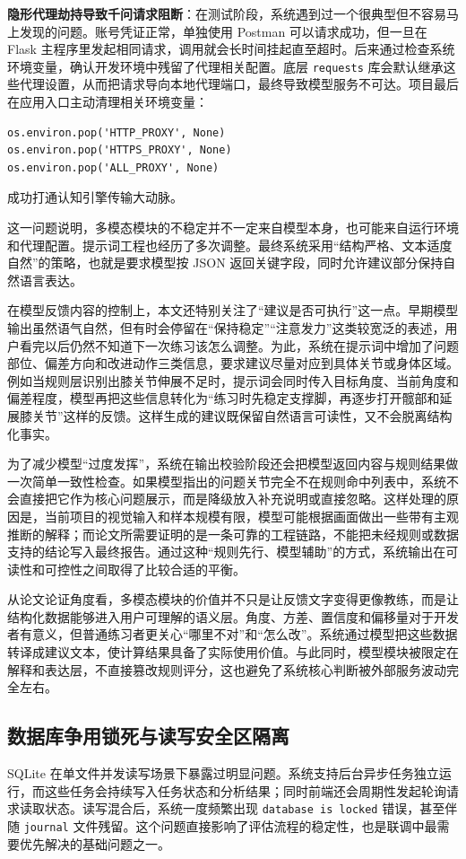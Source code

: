 \documentclass[UTF8,twoside]{ctexrep}
\makeatletter
\def@NAT@last@yr{\@citea}%
\def@NAT@last@yr{-\NAT@penalty}%
\makeatother
\begin{document}
\textbf{隐形代理劫持导致千问请求阻断}：在测试阶段，系统遇到过一个很典型但不容易马上发现的问题。账号凭证正常，单独使用 Postman 可以请求成功，但一旦在 Flask 主程序里发起相同请求，调用就会长时间挂起直至超时。后来通过检查系统环境变量，确认开发环境中残留了代理相关配置。底层 \texttt{requests} 库会默认继承这些代理设置，从而把请求导向本地代理端口，最终导致模型服务不可达。项目最后在应用入口主动清理相关环境变量：
\begin{verbatim}
os.environ.pop('HTTP_PROXY', None)
os.environ.pop('HTTPS_PROXY', None)
os.environ.pop('ALL_PROXY', None)
\end{verbatim}
成功打通认知引擎传输大动脉。

这一问题说明，多模态模块的不稳定并不一定来自模型本身，也可能来自运行环境和代理配置。提示词工程也经历了多次调整。最终系统采用“结构严格、文本适度自然”的策略，也就是要求模型按 JSON 返回关键字段，同时允许建议部分保持自然语言表达。

在模型反馈内容的控制上，本文还特别关注了“建议是否可执行”这一点。早期模型输出虽然语气自然，但有时会停留在“保持稳定”“注意发力”这类较宽泛的表述，用户看完以后仍然不知道下一次练习该怎么调整。为此，系统在提示词中增加了问题部位、偏差方向和改进动作三类信息，要求建议尽量对应到具体关节或身体区域。例如当规则层识别出膝关节伸展不足时，提示词会同时传入目标角度、当前角度和偏差程度，模型再把这些信息转化为“练习时先稳定支撑脚，再逐步打开髋部和延展膝关节”这样的反馈。这样生成的建议既保留自然语言可读性，又不会脱离结构化事实。

为了减少模型“过度发挥”，系统在输出校验阶段还会把模型返回内容与规则结果做一次简单一致性检查。如果模型指出的问题关节完全不在规则命中列表中，系统不会直接把它作为核心问题展示，而是降级放入补充说明或直接忽略。这样处理的原因是，当前项目的视觉输入和样本规模有限，模型可能根据画面做出一些带有主观推断的解释；而论文所需要证明的是一条可靠的工程链路，不能把未经规则或数据支持的结论写入最终报告。通过这种“规则先行、模型辅助”的方式，系统输出在可读性和可控性之间取得了比较合适的平衡。

从论文论证角度看，多模态模块的价值并不只是让反馈文字变得更像教练，而是让结构化数据能够进入用户可理解的语义层。角度、方差、置信度和偏移量对于开发者有意义，但普通练习者更关心“哪里不对”和“怎么改”。系统通过模型把这些数据转译成建议文本，使计算结果具备了实际使用价值。与此同时，模型模块被限定在解释和表达层，不直接篡改规则评分，这也避免了系统核心判断被外部服务波动完全左右。

\subsection{数据库争用锁死与读写安全区隔离}
SQLite 在单文件并发读写场景下暴露过明显问题。系统支持后台异步任务独立运行，而这些任务会持续写入任务状态和分析结果；同时前端还会周期性发起轮询请求读取状态。读写混合后，系统一度频繁出现 \texttt{database is locked} 错误，甚至伴随 \texttt{journal} 文件残留。这个问题直接影响了评估流程的稳定性，也是联调中最需要优先解决的基础问题之一。
\end{document}
